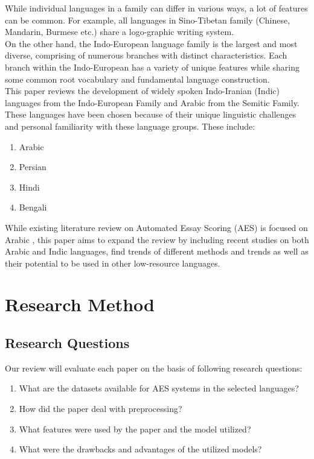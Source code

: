 \documentclass{article}
\begin{document}
	While individual languages in a family can differ in various ways, a lot of features can be common. For example, all languages in Sino-Tibetan family (Chinese, Mandarin, Burmese etc.) share a logo-graphic writing system. \\
	On the other hand, the Indo-European language family is the largest and most diverse, comprising of numerous branches with distinct characteristics. Each branch within the Indo-European has a variety of unique features while sharing some common root vocabulary and fundamental language construction.\\
	
	This paper reviews the development of widely spoken Indo-Iranian (Indic) languages from the Indo-European Family and Arabic from the Semitic Family. These languages have been chosen because of their unique linguistic challenges and personal familiarity with these language groups.
	These include:
	\begin{enumerate}
		\item Arabic
		\item Persian
		\item Hindi
		\item Bengali
	\end{enumerate}
	While existing literature review on Automated Essay Scoring (AES) is focused on Arabic \cite{litreviewarabic}, this paper aims to expand the review by including recent studies on both Arabic and Indic languages, find trends of different methods and trends as well as their potential to be used in other low-resource languages.
	\section{Research Method}
	\subsection{Research Questions}
	Our review will evaluate each paper on the basis of following research questions:
	\begin{enumerate}[label=\textbf{RQ\arabic*}, leftmargin=1.5cm]
		\item What are the datasets available for AES systems in the selected languages?
		\item How did the paper deal with preprocessing?
		\item What features were used by the paper and the model utilized?
		\item What were the drawbacks and advantages of the utilized models?
	\end{enumerate}
\end{document}
